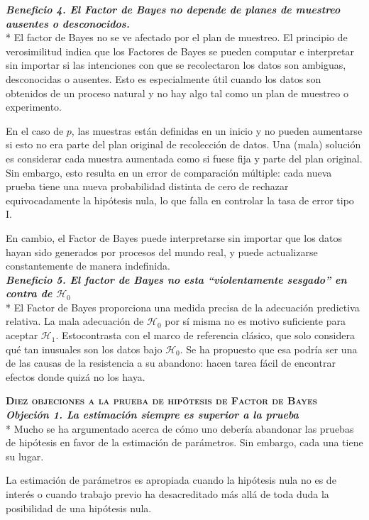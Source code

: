 \documentclass[a4paper,12pt]{article}
\begin{document}
{\slshape\bfseries Beneficio 4. El Factor de Bayes no depende de planes de muestreo ausentes o desconocidos.}\\*
El factor de Bayes no se ve afectado por el plan de muestreo. El principio de verosimilitud indica que los Factores de Bayes se pueden computar e interpretar sin importar si las intenciones con que se recolectaron los datos son ambiguas, desconocidas o ausentes. Esto es especialmente útil cuando los datos son obtenidos de un proceso natural y no hay algo tal como un plan de muestreo o experimento.

En el caso de $p$, las muestras están definidas en un inicio y no pueden aumentarse si esto no era parte del plan original de recolección de datos. Una (mala) solución es considerar cada muestra aumentada como si fuese fija y parte del plan original. Sin embargo, esto resulta en un error de comparación múltiple: cada nueva prueba tiene una nueva probabilidad distinta de cero de rechazar equivocadamente la hipótesis nula, lo que falla en controlar la tasa de error tipo I.

En cambio, el Factor de Bayes puede interpretarse sin importar que los datos hayan sido generados por procesos del mundo real, y puede actualizarse constantemente de manera indefinida.\\

{\slshape\bfseries Beneficio 5. El factor de Bayes no esta ``violentamente sesgado'' en contra de $\mathcal H_0$}\\*
El Factor de Bayes proporciona una medida precisa de la adecuación predictiva relativa. La mala adecuación de $\mathcal H_0$ por sí misma no es motivo suficiente para aceptar $\mathcal H_1$. Estocontrasta con el marco de referencia clásico, que solo considera qué tan inusuales son los datos bajo $\mathcal H_0$. Se ha propuesto que esa podría ser una de las causas de la resistencia a su abandono: hacen tarea fácil de encontrar efectos donde quizá no los haya.

{\scshape\bfseries Diez objeciones a la prueba de hipótesis de Factor de Bayes}\\
{\slshape\bfseries Objeción 1. La estimación siempre es superior a la prueba}\\*
Mucho se ha argumentado acerca de cómo uno debería abandonar las pruebas de hipótesis en favor de la estimación de parámetros. Sin embargo, cada una tiene su lugar.

La estimación de parámetros es apropiada cuando la hipótesis nula no es de interés o cuando trabajo previo ha desacreditado más allá de toda duda la posibilidad de una hipótesis nula.
\end{document}
